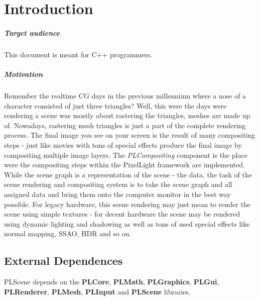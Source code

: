 \chapter{Introduction}


\paragraph{Target audience}
This document is meant for C++ programmers.


\paragraph{Motivation}
Remember the realtime CG days in the previous millennium where a nose of a character consisted of just three triangles? Well, this were the days were rendering a scene was mostly about rastering the triangles, meshes are made up of. Nowadays, rastering mesh triangles is just a part of the complete rendering process. The final image you see on your screen is the result of many compositing steps - just like movies with tons of special effects produce the final image by compositing multiple image layers. The \emph{PLCompositing} component is the place were the compositing steps within the PixelLight framework are implemented. While the scene graph is a representation of the scene - the data, the task of the scene rendering and compositing system is to take the scene graph and all assigned data and bring them onto the computer monitor in the best way possible. For legacy hardware, this scene rendering may just mean to render the scene using simple textures - for decent hardware the scene may be rendered using dynamic lighting and shadowing as well as tons of used special effects like normal mapping, SSAO, HDR and so on.




\section{External Dependences}

PLScene depends on the \textbf{PLCore}, \textbf{PLMath}, \textbf{PLGraphics}, \textbf{PLGui}, \textbf{PLRenderer}, \textbf{PLMesh}, \textbf{PLInput} and \textbf{PLScene} libraries.
